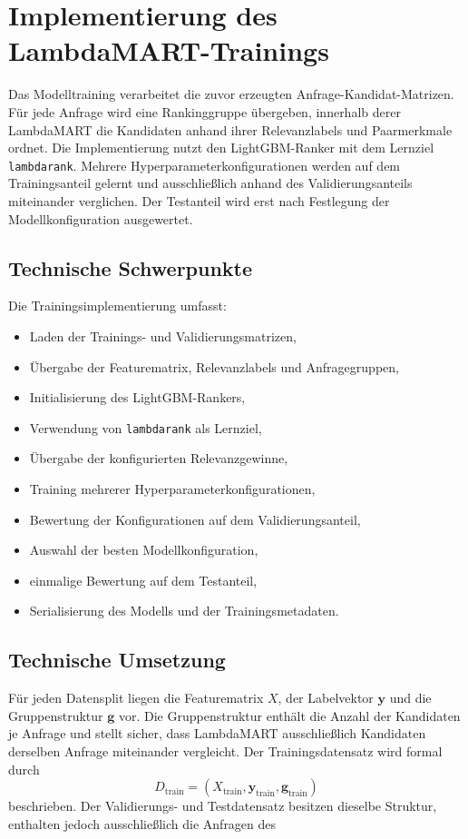 \section{Implementierung des LambdaMART-Trainings} \label{sec:implementierung_des_lambdamart_trainings} Das Modelltraining verarbeitet die zuvor erzeugten Anfrage-Kandidat-Matrizen. Für jede Anfrage wird eine Rankinggruppe übergeben, innerhalb derer LambdaMART die Kandidaten anhand ihrer Relevanzlabels und Paarmerkmale ordnet. Die Implementierung nutzt den LightGBM-Ranker mit dem Lernziel \texttt{lambdarank}. Mehrere Hyperparameterkonfigurationen werden auf dem Trainingsanteil gelernt und ausschließlich anhand des Validierungsanteils miteinander verglichen. Der Testanteil wird erst nach Festlegung der Modellkonfiguration ausgewertet. \subsection{Technische Schwerpunkte} \label{subsec:technische_schwerpunkte_lambdamart_training} Die Trainingsimplementierung umfasst: \begin{itemize} \item Laden der Trainings- und Validierungsmatrizen, \item Übergabe der Featurematrix, Relevanzlabels und Anfragegruppen, \item Initialisierung des LightGBM-Rankers, \item Verwendung von \texttt{lambdarank} als Lernziel, \item Übergabe der konfigurierten Relevanzgewinne, \item Training mehrerer Hyperparameterkonfigurationen, \item Bewertung der Konfigurationen auf dem Validierungsanteil, \item Auswahl der besten Modellkonfiguration, \item einmalige Bewertung auf dem Testanteil, \item Serialisierung des Modells und der Trainingsmetadaten. \end{itemize} \subsection{Technische Umsetzung} \label{subsec:technische_umsetzung_lambdamart_training} Für jeden Datensplit liegen die Featurematrix $X$, der Labelvektor $\boldsymbol{y}$ und die Gruppenstruktur $\boldsymbol{g}$ vor. Die Gruppenstruktur enthält die Anzahl der Kandidaten je Anfrage und stellt sicher, dass LambdaMART ausschließlich Kandidaten derselben Anfrage miteinander vergleicht. Der Trainingsdatensatz wird formal durch \begin{equation} D_{\mathrm{train}} = \left( X_{\mathrm{train}}, \boldsymbol{y}_{\mathrm{train}}, \boldsymbol{g}_{\mathrm{train}} \right) \label{eq:lambdamart_trainingsdaten} \end{equation} beschrieben. Der Validierungs- und Testdatensatz besitzen dieselbe Struktur, enthalten jedoch ausschließlich die Anfragen des 